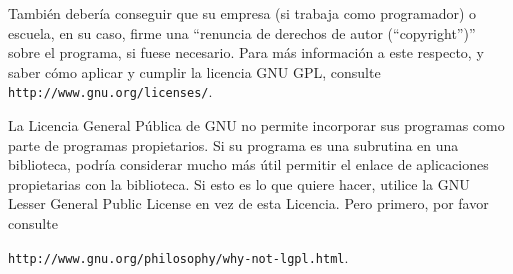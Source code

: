 {\begin{enumerate}
Tambi\'{e}n deber\'{i}a conseguir que su empresa (si trabaja como programador) o 
escuela, en su caso, firme una ``renuncia de derechos de autor (``copyright'')'' sobre el programa, si 
fuese necesario. Para m\'{a}s informaci\'{o}n a este respecto, y saber c\'{o}mo aplicar 
y cumplir la licencia GNU GPL, consulte \texttt{http://www.gnu.org/licenses/}. 

La Licencia General P\'{u}blica de GNU no permite incorporar sus programas como 
parte de programas propietarios. Si su programa es una subrutina en una 
biblioteca, podr\'{i}a considerar mucho m\'{a}s \'{u}til permitir el enlace de 
aplicaciones propietarias con la biblioteca. Si esto es lo que quiere hacer, 
utilice la GNU Lesser General Public License en vez de esta Licencia. Pero primero, por favor consulte

\texttt{http://www.gnu.org/philosophy/why-not-lgpl.html}.

\end{enumerate}
}